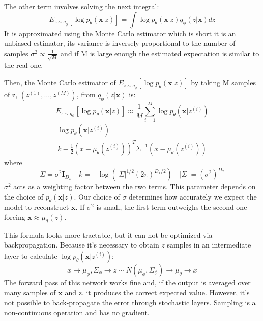 \documentclass[5p,sort&compress]{elsarticle}
\begin{document}
The other term involves solving the next integral:
\begin{equation}
E_{z \sim q_{\phi}}\left[\log p_{\theta}(\boldsymbol{x} | z)\right]=\int \log p_{\theta}(\boldsymbol{x} | z) q_{\phi}(z | \boldsymbol{x}) d z
\end{equation}
It is approximated using the Monte Carlo estimator which is short it is an unbiased estimator, its variance is inversely proportional to the number of samples $\sigma^2 \propto \frac{1}{\sqrt{M}}$ and if M is large enough the estimated expectation is similar to the real one.

Then, the Monte Carlo estimator of $E_{z \sim q_{\phi}}\left[\log p_{\theta}(\boldsymbol{x} | z)\right]$ by taking M samples of z, $(z^{(1)}, \ldots, z^{(M)})$, from $q_{\phi}(z|\boldsymbol{x})$ is:
\begin{equation}
E_{z \sim q_{\phi}}\left[\log p_{\theta}(\boldsymbol{x} | z)\right] \approx \frac{1}{M} \sum_{i=1}^{M} \log p_{\theta}(\boldsymbol{x} | z^{(i)})
\end{equation}
\begin{equation}
\begin{aligned}
\log p_{\theta}(\boldsymbol{x} | z^{(i)}) = \\
k-\frac{1}{2}(x-\mu_{\theta}(z^{(i)}))^{T} \Sigma^{-1}(x-\mu_{\theta}(z^{(i)}))
\end{aligned}
\end{equation}
where
\begin{equation}
\Sigma=\sigma^{2} \boldsymbol{I}_{D_{x}} \quad k=-\log \left(|\Sigma|^{1 / 2}(2 \pi)^{D_{x} / 2}\right) \quad|\Sigma|=\left(\sigma^{2}\right)^{D_{x}}
\end{equation}
$\sigma^2$ acts as a weighting factor between the two terms. This parameter depends on the choice of $p_{\theta}(\boldsymbol{x}|z)$. Our choice of $\sigma$ determines how accurately we expect the model to reconstruct $\boldsymbol{x}$. If $\sigma^2$ is small, the first term outweighs the second one forcing $\boldsymbol{x} \approx \mu_{\theta}(z)$.

This formula looks more tractable, but it can not be optimized via backpropagation. Because it's necessary to obtain $z$ samples in an intermediate layer to calculate $\log p_{\theta}(\boldsymbol{x}|z^{(i)})$:
\begin{equation}
x \rightarrow \mu_{\phi}, \Sigma_{\phi} \rightarrow z \sim N\left(\mu_{\phi}, \Sigma_{\phi}\right) \rightarrow \mu_{\theta} \rightarrow x
\end{equation}
The forward pass of this network works fine and, if the output is averaged over many samples of $\boldsymbol{x}$ and z, it produces the correct expected value. However, it's not possible to back-propagate the error through stochastic layers. Sampling is a non-continuous operation and has no gradient.
\end{document}
